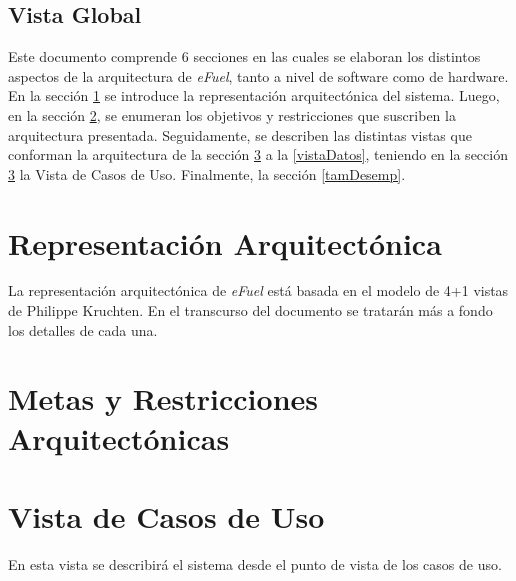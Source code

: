 \documentclass{article}
\begin{document}
    \subsection{Vista Global}
    Este documento comprende 6 secciones en las cuales se elaboran los distintos aspectos de la arquitectura de \emph{eFuel}, tanto a nivel de software como de hardware. En la sección \ref{reprArq} se introduce la representación arquitectónica del sistema. Luego, en la sección \ref{metasArq}, se enumeran los objetivos y restricciones que suscriben la arquitectura presentada. Seguidamente, se describen las distintas vistas que conforman la arquitectura de la sección \ref{vistaCasosDeUso} a la \ref{vistaDatos}, teniendo en la sección \ref{vistaCasosDeUso} la Vista de Casos de Uso. Finalmente, la sección \ref{tamDesemp}.


    \section{Representación Arquitectónica} \label{reprArq}
    La representación arquitectónica de \emph{eFuel} está basada en el modelo de 4+1 vistas de Philippe Kruchten. En el transcurso del documento se tratarán más a fondo los detalles de cada una.

    \section{Metas y Restricciones Arquitectónicas} \label{metasArq}

    
    \section{Vista de Casos de Uso} \label{vistaCasosDeUso}
    En esta vista se describirá el sistema desde el punto de vista de los casos de uso.
\end{document}
